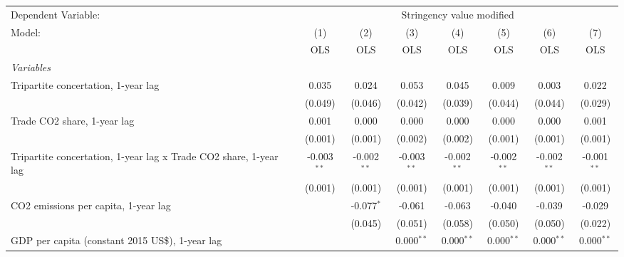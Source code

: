
\begingroup
\centering
\begin{tabular}{lccccccc}
   \toprule
   Dependent Variable: & \multicolumn{7}{c}{Stringency value modified}\\
   Model:                                                            & (1)           & (2)           & (3)           & (4)           & (5)           & (6)           & (7)\\  
                                                                     &  OLS          & OLS           & OLS           & OLS           & OLS           & OLS           & OLS\\  
   \midrule
   \emph{Variables}\\
   Tripartite concertation, 1-year lag                               & 0.035         & 0.024         & 0.053         & 0.045         & 0.009         & 0.003         & 0.022\\   
                                                                     & (0.049)       & (0.046)       & (0.042)       & (0.039)       & (0.044)       & (0.044)       & (0.029)\\   
   Trade CO2 share, 1-year lag                                       & 0.001         & 0.000         & 0.000         & 0.000         & 0.000         & 0.000         & 0.001\\   
                                                                     & (0.001)       & (0.001)       & (0.002)       & (0.002)       & (0.001)       & (0.001)       & (0.001)\\   
   Tripartite concertation, 1-year lag x Trade CO2 share, 1-year lag & -0.003$^{**}$ & -0.002$^{**}$ & -0.003$^{**}$ & -0.002$^{**}$ & -0.002$^{**}$ & -0.002$^{**}$ & -0.001$^{**}$\\   
                                                                     & (0.001)       & (0.001)       & (0.001)       & (0.001)       & (0.001)       & (0.001)       & (0.001)\\   
   CO2 emissions per capita, 1-year lag                              &               & -0.077$^{*}$  & -0.061        & -0.063        & -0.040        & -0.039        & -0.029\\   
                                                                     &               & (0.045)       & (0.051)       & (0.058)       & (0.050)       & (0.050)       & (0.022)\\   
   GDP per capita (constant 2015 US\$), 1-year lag                   &               &               & 0.000$^{**}$  & 0.000$^{**}$  & 0.000$^{**}$  & 0.000$^{**}$  & 0.000$^{**}$\\   

\end{tabular}
